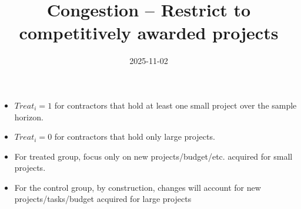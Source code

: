 \documentclass[
]{article}
\title{Congestion -- Restrict to competitively awarded projects}
\author{}
\date{\vspace{-2.5em}2025-11-02}
\providecommand{\tightlist}{%
  \setlength{\itemsep}{0pt}\setlength{\parskip}{0pt}}
\begin{document}
\maketitle

\begin{itemize}
\tightlist
\item
  \(Treat_i=1\) for contractors that hold at least one small project
  over the sample horizon.
\item
  \(Treat_i=0\) for contractors that hold only large projects.
\item
  For treated group, focus only on new projects/budget/etc. acquired for
  small projects.
\item
  For the control group, by construction, changes will account for new
  projects/tasks/budget acquired for large projects
\end{itemize}
\end{document}
